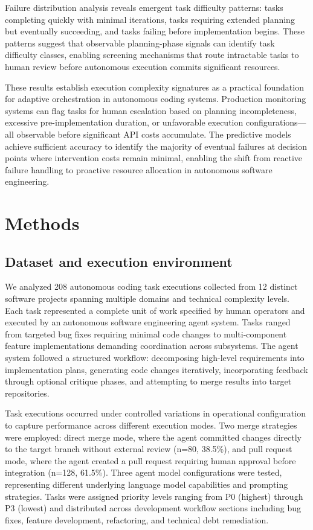 \documentclass[]{article}
\begin{document}
Failure distribution analysis reveals emergent task difficulty patterns: tasks completing quickly with minimal iterations, tasks requiring extended planning but eventually succeeding, and tasks failing before implementation begins. These patterns suggest that observable planning-phase signals can identify task difficulty classes, enabling screening mechanisms that route intractable tasks to human review before autonomous execution commits significant resources.

These results establish execution complexity signatures as a practical foundation for adaptive orchestration in autonomous coding systems. Production monitoring systems can flag tasks for human escalation based on planning incompleteness, excessive pre-implementation duration, or unfavorable execution configurations—all observable before significant API costs accumulate. The predictive models achieve sufficient accuracy to identify the majority of eventual failures at decision points where intervention costs remain minimal, enabling the shift from reactive failure handling to proactive resource allocation in autonomous software engineering.



\section{Methods}
\label{sec:methods}


\subsection{Dataset and execution environment}

We analyzed 208 autonomous coding task executions collected from 12 distinct software projects spanning multiple domains and technical complexity levels. Each task represented a complete unit of work specified by human operators and executed by an autonomous software engineering agent system. Tasks ranged from targeted bug fixes requiring minimal code changes to multi-component feature implementations demanding coordination across subsystems. The agent system followed a structured workflow: decomposing high-level requirements into implementation plans, generating code changes iteratively, incorporating feedback through optional critique phases, and attempting to merge results into target repositories.

Task executions occurred under controlled variations in operational configuration to capture performance across different execution modes. Two merge strategies were employed: direct merge mode, where the agent committed changes directly to the target branch without external review (n=80, 38.5\%), and pull request mode, where the agent created a pull request requiring human approval before integration (n=128, 61.5\%). Three agent model configurations were tested, representing different underlying language model capabilities and prompting strategies. Tasks were assigned priority levels ranging from P0 (highest) through P3 (lowest) and distributed across development workflow sections including bug fixes, feature development, refactoring, and technical debt remediation.
\end{document}
